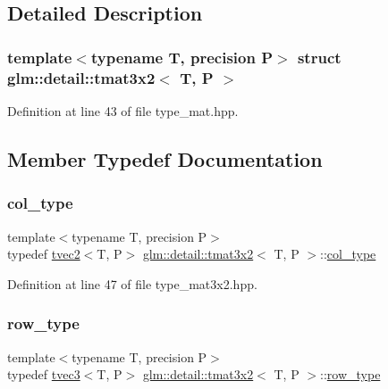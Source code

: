 \subsection{Detailed Description}
\subsubsection*{template$<$typename T, precision P$>$\newline
struct glm\+::detail\+::tmat3x2$<$ T, P $>$}



Definition at line 43 of file type\+\_\+mat.\+hpp.



\subsection{Member Typedef Documentation}
\mbox{\label{structglm_1_1detail_1_1tmat3x2_a9c0f2cfe8e359b2917b5f616a5dbc9e4}} 
\subsubsection{\texorpdfstring{col\+\_\+type}{col\_type}}
{\footnotesize\ttfamily template$<$typename T, precision P$>$ \\
typedef \hyperlink{structglm_1_1detail_1_1tvec2}{tvec2}$<$T, P$>$ \hyperlink{structglm_1_1detail_1_1tmat3x2}{glm\+::detail\+::tmat3x2}$<$ T, P $>$\+::\hyperlink{structglm_1_1detail_1_1tmat3x2_a9c0f2cfe8e359b2917b5f616a5dbc9e4}{col\+\_\+type}}



Definition at line 47 of file type\+\_\+mat3x2.\+hpp.

\mbox{\label{structglm_1_1detail_1_1tmat3x2_a4e9b5f959b95a291c070d0f60195306f}} 
\subsubsection{\texorpdfstring{row\+\_\+type}{row\_type}}
{\footnotesize\ttfamily template$<$typename T, precision P$>$ \\
typedef \hyperlink{structglm_1_1detail_1_1tvec3}{tvec3}$<$T, P$>$ \hyperlink{structglm_1_1detail_1_1tmat3x2}{glm\+::detail\+::tmat3x2}$<$ T, P $>$\+::\hyperlink{structglm_1_1detail_1_1tmat3x2_a4e9b5f959b95a291c070d0f60195306f}{row\+\_\+type}}



